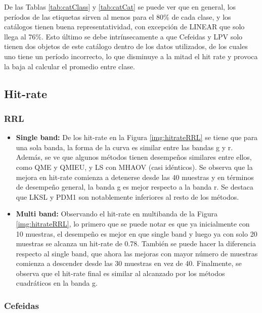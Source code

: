 	De las Tablas \ref{tab:catClass} y \ref{tab:catCat} se puede ver que en general, los períodos de las etiquetas sirven al menos para el 80\% de cada clase, y los catálogos tienen buena representatividad, con excepción de LINEAR que solo llega al 76\%.	Esto último se debe intrínsecamente a que Cefeidas y LPV solo tienen dos objetos de este catálogo dentro de los datos utilizados, de los cuales uno tiene un período incorrecto, lo que disminuye a la mitad el hit rate y provoca la baja al calcular el promedio entre clase.

\newpage
    \subsection{Hit-rate}
        \subsubsection{RRL}
    	
    	\begin{itemize}
    	    \item \textbf{Single band:} De los hit-rate en la Figura \ref{img:hitrateRRL} se tiene que para una sola banda, la forma de la curva es similar entre las bandas g y r. Además, se ve que algunos métodos tienen desempeños similares entre ellos, como QME y QMIEU, y LS con MHAOV (casi idénticos). Se observa que la mejora en hit-rate comienza a detenerse desde las 40 muestras y en términos de desempeño general, la banda g es mejor respecto a la banda r. Se destaca que LKSL y PDM1 son notablemente inferiores al resto de los métodos.
    	    
    	    \item \textbf{Multi band:} Observando el hit-rate en multibanda de la Figura \ref{img:hitrateRRL}, lo primero que se puede notar es que ya inicialmente con 10 muestras, el desempeño es mejor en que single band y luego ya con solo 20 muestras se alcanza un hit-rate de 0.78. También se puede hacer la diferencia respecto al single band, que ahora las mejoras con mayor número de muestras comienza a descender desde las 30 muestras en vez de 40. Finalmente, se observa que el hit-rate final es similar al alcanzado por los métodos cuadráticos en la banda g.
    	\end{itemize}
    	
	    \subsubsection{Cefeidas}
    	
